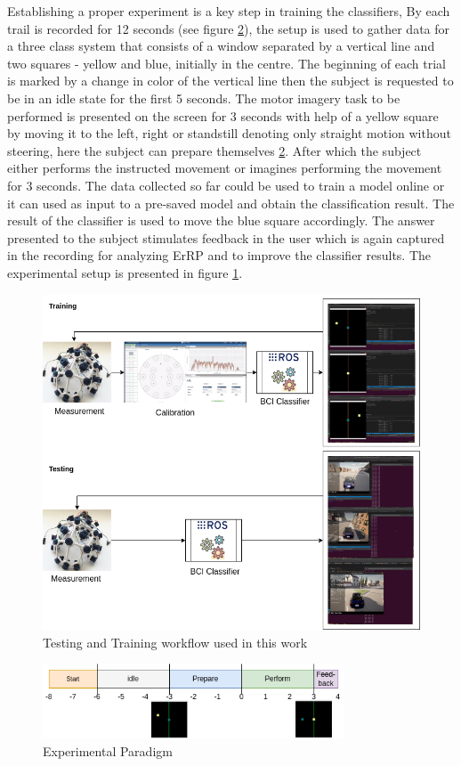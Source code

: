 Establishing a proper experiment is a key step in training the classifiers, By \cite{2021_MI_DCNN} each trail is recorded for 12 seconds (see figure \ref{fig:experiment}), the setup is used to gather data for a three class system that consists of a window separated by a vertical line and two squares - yellow and blue, initially in the centre. The beginning of each trial is marked by a change in color of the vertical line then the subject is requested to be in an idle state for the first 5 seconds. The motor imagery task to be performed is presented on the screen  for 3 seconds with help of a yellow square by moving it to the left, right or standstill denoting only straight motion without steering, here the subject can prepare themselves \ref{fig:experiment}. After which the subject either performs the instructed movement or imagines performing the movement for 3 seconds. The data collected so far could be used to train a model online or it can used as input to a pre-saved model and obtain the classification result. The result of the classifier is used to move the blue square accordingly. The answer presented to the subject stimulates feedback in the user which is again captured in the recording for analyzing ErRP and to improve the classifier results. The experimental setup is presented in figure \ref{fig:exp_setup}.

\begin{figure}[H] 
    \begin{center}
    \includegraphics[height=0.6\textwidth]{images/exp_setup.png}
    \caption{Testing and Training workflow used in this work}
    \label{fig:exp_setup}
    \end{center}
\end{figure}

\begin{figure}[H] 
    \begin{center}
    \includegraphics[width=0.8\textwidth]{images/experiment.png}
    \caption{Experimental Paradigm}
    \label{fig:experiment}
    \end{center}
\end{figure}

